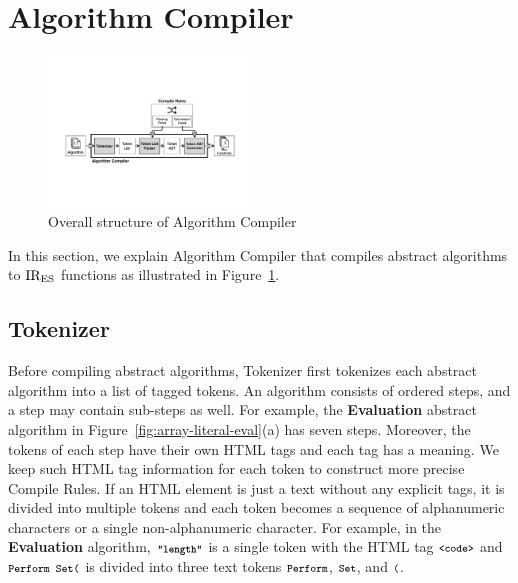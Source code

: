 \section{Algorithm Compiler}\label{sec:compiler}
\begin{figure}
  \centering
  \includegraphics[width=0.48\textwidth]{img/algo-compiler.pdf}
  \caption{Overall structure of {\sf Algorithm Compiler}}
  \label{fig:algo-compiler}
\end{figure}

In this section, we explain {\sf Algorithm Compiler} that compiles
abstract algorithms to \( \text{IR}_\text{ES} \) functions as illustrated in
Figure~\ref{fig:algo-compiler}.

\subsection{Tokenizer}
Before compiling abstract algorithms, {\sf Tokenizer} first tokenizes each
abstract algorithm into a list of tagged tokens.  An algorithm consists of
ordered steps, and a step may contain sub-steps as well.  For example, the
\textbf{\small Evaluation} abstract algorithm in
Figure~\ref{fig:array-literal-eval}(a) has seven steps.  Moreover, the tokens of
each step have their own HTML tags and each tag has a meaning.  We keep such
HTML tag information for each token to construct more precise {\sf Compile
Rules}. If an HTML element is just a text without any explicit tags, it is
divided into multiple tokens and each token becomes a sequence of alphanumeric
characters or a single non-alphanumeric character.  For example, in the
\textbf{\small Evaluation} algorithm, \( \textbf{\texttt{\footnotesize"length"}} \) is a single
token with the HTML tag \( \texttt{\footnotesize<code>} \) and \( \texttt{\footnotesize Perform Set(} \) is
divided into three text tokens \( \texttt{\footnotesize Perform} \), \( \texttt{\footnotesize Set} \), and \(
\texttt{\footnotesize(} \).

